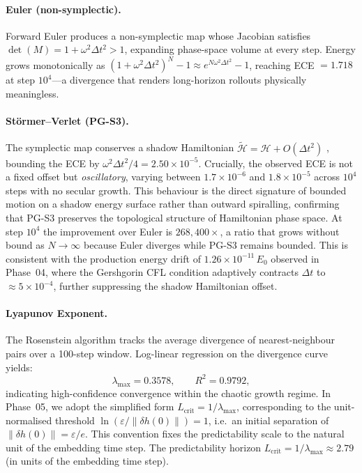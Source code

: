 \documentclass[10pt,twocolumn]{article}
\begin{document}
\paragraph{Euler (non-symplectic).}
Forward Euler produces a non-symplectic map whose Jacobian
satisfies $\det(M) = 1 + \omega^2\Delta t^2 > 1$, expanding
phase-space volume at every step.
Energy grows monotonically as
$(1+\omega^2\Delta t^2)^N - 1 \approx e^{N\omega^2\Delta t^2} - 1$,
reaching ECE $= 1.718$ at step $10^4$---a divergence that renders
long-horizon rollouts physically meaningless.

\paragraph{St\"{o}rmer--Verlet (PG-S3).}
The symplectic map conserves a shadow Hamiltonian
$\tilde{\mathcal{H}} = \mathcal{H} + O(\Delta t^2)$
\cite{hairer2006geometric},
bounding the ECE by $\omega^2\Delta t^2/4 = 2.50\times10^{-5}$.
Crucially, the observed ECE is not a fixed offset but
\emph{oscillatory}, varying between $1.7\times10^{-6}$
and $1.8\times10^{-5}$ across $10^4$ steps with no
secular growth.
This behaviour is the direct signature of bounded motion on a shadow energy
surface rather than outward spiralling, confirming that
PG-S3 preserves the topological structure of Hamiltonian
phase space.
At step $10^4$ the improvement over Euler is $268{,}400\times$,
a ratio that grows without bound as $N\to\infty$
because Euler diverges while PG-S3 remains bounded.
This is consistent with the production energy drift of
$1.26\times10^{-11}\,E_0$ observed in Phase~04,
where the Gershgorin CFL condition adaptively contracts
$\Delta t$ to ${\approx}5\times10^{-4}$, further suppressing
the shadow Hamiltonian offset.

\paragraph{Lyapunov Exponent.}
The Rosenstein algorithm \cite{rosenstein1993practical}
tracks the average divergence of nearest-neighbour pairs
over a 100-step window.
Log-linear regression on the divergence curve yields:
\begin{equation}
  \lambda_{\max} = 0.3578, \qquad R^2 = 0.9792,
  \label{eq:lambda}
\end{equation}
indicating high-confidence convergence within the chaotic
growth regime. In Phase~05, we adopt the simplified form $L_{\text{crit}} = 1/\lambda_{\max}$,
corresponding to the unit-normalised threshold
$\ln(\varepsilon / \|\delta h(0)\|) = 1$,
i.e.\ an initial separation of $\|\delta h(0)\| = \varepsilon/e$.
This convention fixes the predictability scale to the natural
unit of the embedding time step.
The predictability horizon $L_{\text{crit}} = 1/\lambda_{\max} \approx 2.79$
(in units of the embedding time step).
\end{document}
